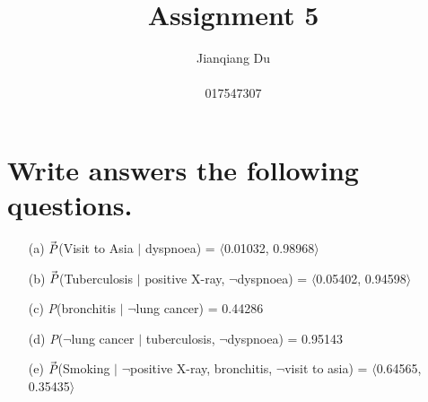 \documentclass{article}
\begin{document}
\title{\LARGE Assignment 5}
\author{Jianqiang Du\\\\017547307}
\maketitle

\section{Write answers the following questions.}
\begin{itemize}
\item[(a)]$\vec{\textit P}$(Visit to Asia $\vert$ dyspnoea) = $\langle$0.01032, 0.98968$\rangle$
\item[(b)]$\vec{\textit P}$(Tuberculosis $\vert$ positive X-ray, $\neg$dyspnoea) = $\langle$0.05402, 0.94598$\rangle$
\item[(c)]\textit P(bronchitis $\vert$ $\neg$lung cancer) = 0.44286
\item[(d)]\textit P($\neg$lung cancer $\vert$ tuberculosis, $\neg$dyspnoea) = 0.95143
\item[(e)]$\vec{\textit P}$(Smoking $\vert$ $\neg$positive X-ray, bronchitis, $\neg$visit to asia) = $\langle$0.64565, 0.35435$\rangle$
\end{itemize}
\end{document}
